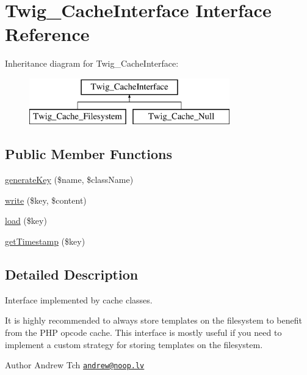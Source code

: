 \hypertarget{interfaceTwig__CacheInterface}{}\section{Twig\+\_\+\+Cache\+Interface Interface Reference}
\label{interfaceTwig__CacheInterface}
Inheritance diagram for Twig\+\_\+\+Cache\+Interface\+:\begin{figure}[H]
\begin{center}
\leavevmode
\includegraphics[height=2.000000cm]{interfaceTwig__CacheInterface}
\end{center}
\end{figure}
\subsection*{Public Member Functions}
\begin{DoxyCompactItemize}
\item 
\hyperlink{interfaceTwig__CacheInterface_a5b0e46b0b72ca21d4d235e8fb1dd6eb2}{generate\+Key} (\$name, \$class\+Name)
\item 
\hyperlink{interfaceTwig__CacheInterface_a0409f68b18c164c09950f21c54aae4b6}{write} (\$key, \$content)
\item 
\hyperlink{interfaceTwig__CacheInterface_a0db4a0540835f3762c1fc48255d26c85}{load} (\$key)
\item 
\hyperlink{interfaceTwig__CacheInterface_a1b5b8b2f60ddfba44cfbdbd6acf7016d}{get\+Timestamp} (\$key)
\end{DoxyCompactItemize}


\subsection{Detailed Description}
Interface implemented by cache classes.

It is highly recommended to always store templates on the filesystem to benefit from the P\+HP opcode cache. This interface is mostly useful if you need to implement a custom strategy for storing templates on the filesystem.

\begin{DoxyAuthor}{Author}
Andrew Tch \href{mailto:andrew@noop.lv}{\tt andrew@noop.\+lv} 
\end{DoxyAuthor}


